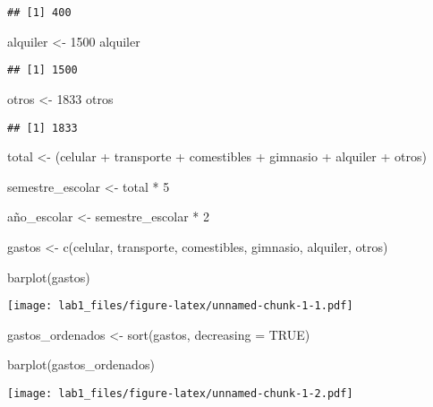 \documentclass[
]{article}
\newenvironment{Shaded}{\begin{snugshade}}{\end{snugshade}}
\newcommand{\AttributeTok}[1]{\textcolor[rgb]{0.77,0.63,0.00}{#1}}
\newcommand{\ConstantTok}[1]{\textcolor[rgb]{0.00,0.00,0.00}{#1}}
\newcommand{\DecValTok}[1]{\textcolor[rgb]{0.00,0.00,0.81}{#1}}
\newcommand{\FunctionTok}[1]{\textcolor[rgb]{0.00,0.00,0.00}{#1}}
\newcommand{\NormalTok}[1]{#1}
\newcommand{\OtherTok}[1]{\textcolor[rgb]{0.56,0.35,0.01}{#1}}
\newcommand{\SpecialCharTok}[1]{\textcolor[rgb]{0.00,0.00,0.00}{#1}}
\begin{document}
\begin{verbatim}
## [1] 400
\end{verbatim}

\begin{Shaded}
\begin{Highlighting}[]
\NormalTok{alquiler }\OtherTok{\textless{}{-}} \DecValTok{1500}
\NormalTok{alquiler }
\end{Highlighting}
\end{Shaded}

\begin{verbatim}
## [1] 1500
\end{verbatim}

\begin{Shaded}
\begin{Highlighting}[]
\NormalTok{otros }\OtherTok{\textless{}{-}} \DecValTok{1833}
\NormalTok{otros}
\end{Highlighting}
\end{Shaded}

\begin{verbatim}
## [1] 1833
\end{verbatim}

\begin{Shaded}
\begin{Highlighting}[]
\NormalTok{total }\OtherTok{\textless{}{-}}\NormalTok{ (celular }\SpecialCharTok{+}\NormalTok{ transporte }\SpecialCharTok{+}\NormalTok{ comestibles }\SpecialCharTok{+}\NormalTok{ gimnasio }\SpecialCharTok{+}\NormalTok{ alquiler }\SpecialCharTok{+}\NormalTok{ otros)}

\NormalTok{semestre\_escolar }\OtherTok{\textless{}{-}}\NormalTok{ total }\SpecialCharTok{*} \DecValTok{5}

\NormalTok{año\_escolar }\OtherTok{\textless{}{-}}\NormalTok{ semestre\_escolar }\SpecialCharTok{*} \DecValTok{2}

\NormalTok{gastos }\OtherTok{\textless{}{-}} \FunctionTok{c}\NormalTok{(celular, transporte, comestibles, gimnasio, alquiler, otros)}

\FunctionTok{barplot}\NormalTok{(gastos)}
\end{Highlighting}
\end{Shaded}

\texttt{[image: lab1\_files/figure-latex/unnamed-chunk-1-1.pdf]}

\begin{Shaded}
\begin{Highlighting}[]
\NormalTok{gastos\_ordenados }\OtherTok{\textless{}{-}} \FunctionTok{sort}\NormalTok{(gastos, }\AttributeTok{decreasing =} \ConstantTok{TRUE}\NormalTok{)}

\FunctionTok{barplot}\NormalTok{(gastos\_ordenados)}
\end{Highlighting}
\end{Shaded}

\texttt{[image: lab1\_files/figure-latex/unnamed-chunk-1-2.pdf]}
\end{document}

